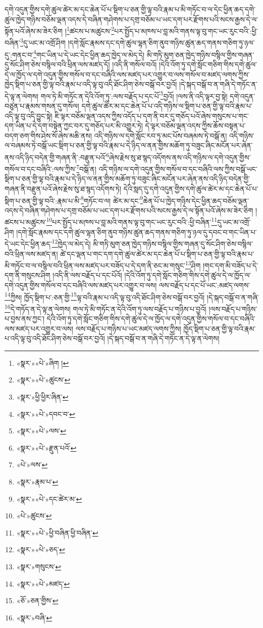 དགེ་འདུན་གྱིས་དགེ་ཚུལ་ཚེར་མ་དང་ཆེན་པོ་པ་སྡིག་པ་ཅན་གྱི་ལྟ་བའི་རྣམ་པ་མི་གཏོང་བ་ལ་དེང་ཕྱིན་ཆད་དགེ་ཚུལ་ཁྱེད་གཉིས་བཅོམ་ལྡན་འདས་དེ་བཞིན་གཤེགས་པ་དགྲ་བཅོམ་པ་ཡང་དག་པར་རྫོགས་པའི་སངས་རྒྱས་དེ་ལ་སྟོན་པའོ་ཞེས་མ་ཟེར་ཅིག །\footnote{«སྣར་»«པེ་»ཞིག །}ཚངས་པ་མཚུངས་\footnote{«སྣར་»«པེ་»ཚུངས་}པར་སྤྱོད་པ་མཁས་པ་བླ་མའི་གནས་ལྟ་བུ་གང་ཡང་རུང་བའི་:ཕྱི་བཞིན་\footnote{«སྣར་»ཕྱི་ཕྱིར་ཞིན་}དུ་ཡང་མ་འགྲོ་ཤིག །དགེ་སློང་རྣམས་དང་དགེ་ཚུལ་ལྷན་ཅིག་ནུབ་གཉིས་ཚུན་ཆད་གནས་གཅིག་ཏུ་ཉལ་དུ་:གནང་བ་\footnote{«སྣར་»«པེ་»དབང་བ་}གང་ཡིན་པ་དེ་ཡང་དེང་ཕྱིན་ཆད་ཁྱེད་ལ་མེད་དེ། མི་གཏི་མུག་ཅན་ཁྱེད་གཉིས་བསྙིལ་གྱིས་གཞན་དུ་སོང་ཤིག་ཅེས་བསྙིལ་བའི་ཕྲིན་ལས་མཛད་དོ། །འདི་ནི་གསོལ་བའོ། །དེའི་འོག་ཏུ་དགེ་སློང་གཅིག་གིས་དགེ་ཚུལ་དེ་ལ་ཁྱོད་ལ་དགེ་འདུན་གྱིས་གསོལ་བ་དང་བཞིའི་ལས་མཛད་པར་འགྱུར་བ་ལས་གསོལ་བ་མཛད་ལགས་ཀྱིས་ཁྱེད་སྡིག་པ་ཅན་གྱི་ལྟ་བའི་རྣམ་པ་འདི་ལྟ་བུ་འདི་ཐོང་ཤིག་ཅེས་བསྒོ་བར་བྱའོ། །དེ་སྐད་བསྒོ་བ་ན་གཞི་དེ་གཏོང་ན་དེ་ལྟ་ན་ལེགས། གལ་ཏེ་མི་གཏོང་ན་དེའི་འོག་ཏུ་:ལས་བརྗོད་པ་དང་པོ་\footnote{«སྣར་»«པེ་»ལས་}བྱའོ། །ལས་ནི་འདི་ལྟར་བྱ་སྟེ། དགེ་འདུན་བཙུན་པ་རྣམས་གསན་དུ་གསོལ། དགེ་ཚུལ་ཚེར་མ་དང་ཆེན་པོ་པ་འདི་གཉིས་ལ་སྡིག་པ་ཅན་གྱི་ལྟ་བའི་རྣམ་པ་འདི་ལྟ་བུ་འདི་བྱུང་སྟེ། ཇི་ལྟར་བཅོམ་ལྡན་འདས་ཀྱིས་འདོད་པ་དག་ནི་བར་དུ་གཅོད་པའོ་ཞེས་གསུངས་པ་གང་དག་ཡིན་པ་དེ་དག་བསྟེན་ཀྱང་བར་དུ་གཅོད་པར་མི་འགྱུར་ཏེ། དེ་ལྟར་བཅོམ་ལྡན་འདས་ཀྱིས་ཆོས་བསྟན་པ་བདག་ཅག་གིས་ཤེས་སོ་ཞེས་མཆི་ནས། འདི་གཉིས་ལ་དགེ་སློང་རབ་ཏུ་མང་པོས་བཞམས་ཏེ་བསྒོ་ན། འདི་གཉིས་ལ་བཞམས་ཏེ་བསྒོ་ཡང་སྡིག་པ་ཅན་གྱི་ལྟ་བའི་རྣམ་པ་དེ་ཉིད་ལ་ནན་གྱིས་མཆོག་ཏུ་བཟུང་ཞིང་མངོན་པར་ཞེན་ནས་འདི་ཉིད་བདེན་གྱི་གཞན་ནི་:བརྫུན་པའོ་\footnote{«སྣར་»«པེ་»རྫུན་པའོ་}ཞེས་རྗེས་སུ་ཐ་སྙད་འདོགས་ནས་འདི་གཉིས་ལ་དགེ་འདུན་གྱིས་གསོལ་བ་དང་བཞིའི་:ལས་ཀྱིས་\footnote{«པེ་»ལས་}བསྒོ་ན། འདི་གཉིས་ལ་དགེ་འདུན་གྱིས་གསོལ་བ་དང་བཞིའི་ལས་ཀྱིས་བསྒོ་ཡང་སྡིག་པ་ཅན་གྱི་ལྟ་བའི་རྣམ་པ་དེ་ཉིད་ལ་ནན་གྱིས་མཆོག་ཏུ་བཟུང་ཞིང་མངོན་པར་ཞེན་ནས་འདི་ཉིད་བདེན་གྱི་གཞན་ནི་བརྫུན་པའོ་ཞེས་རྗེས་སུ་ཐ་སྙད་འདོགས་ཏེ། དེའི་སླད་དུ་དགེ་འདུན་གྱིས་དགེ་ཚུལ་ཚེར་མ་དང་ཆེན་པོ་པ་སྡིག་པ་ཅན་གྱི་ལྟ་བའི་:རྣམ་པ་མི་\footnote{«སྣར་»རྣམ་པ་}གཏོང་བ་ལ། ཚེར་མ་དང་\footnote{«སྣར་»«པེ་»དང་ཚེར་མ་}ཆེན་པོ་པ་ཁྱེད་གཉིས་དེང་ཕྱིན་ཆད་བཅོམ་ལྡན་འདས་དེ་བཞིན་གཤེགས་པ་དགྲ་བཅོམ་པ་ཡང་དག་པར་རྫོགས་པའི་སངས་རྒྱས་དེ་ལ་སྟོན་པའོ་ཞེས་མ་ཟེར་ཅིག །ཚངས་པ་མཚུངས་\footnote{«པེ་»ཚུངས་}པར་སྤྱོད་པ་མཁས་པ་བླ་མའི་གནས་ལྟ་བུ་གང་ཡང་རུང་བའི་:ཕྱི་བཞིན་\footnote{«སྣར་»«པེ་»ཕྱི་བཞིན་ཕྱི་བཞིན་}དུ་ཡང་མ་འགྲོ་ཤིག །དགེ་སློང་རྣམས་དང་དགེ་ཚུལ་ལྷན་ཅིག་ནུབ་གཉིས་ཚུན་ཆད་གནས་གཅིག་ཏུ་ཉལ་དུ་དབང་བ་གང་ཡིན་པ་དེ་ཡང་དེང་ཕྱིན་ཆད་\footnote{«སྣར་»«པེ་»ཅད་}ཁྱེད་ལ་མེད་དེ། མི་གཏི་མུག་ཅན་ཁྱེད་གཉིས་བསྙིལ་གྱིས་གཞན་དུ་སོང་ཤིག་ཅེས་བསྙིལ་བའི་ཕྲིན་ལས་མཛད་ན། ཚེ་དང་ལྡན་པ་གང་དག་དགེ་ཚུལ་ཚེར་མ་དང་ཆེན་པོ་པ་སྡིག་པ་ཅན་གྱི་ལྟ་བའི་རྣམ་པ་མི་གཏོང་བ་ལ་བསྙིལ་བའི་ཕྲིན་ལས་མཛད་པར་བཟོད་པ་དེ་དག་ནི་ཅང་མ་གསུང་\footnote{«སྣར་»གསུངས་}ཤིག །གང་དག་མི་བཟོད་པ་དེ་དག་ནི་གསུངས་ཤིག །འདི་ནི་ལས་བརྗོད་པ་དང་པོའོ། །དེའི་འོག་ཏུ་དགེ་སློང་གཅིག་གིས་དགེ་ཚུལ་དེ་ལ་ཁྱོད་ལ་དགེ་འདུན་གྱིས་གསོལ་བ་དང་བཞིའི་ལས་མཛད་པར་འགྱུར་བ་ལས། ལས་བརྗོད་པ་དང་པོ་ཡང་:མཛད་ལགས་\footnote{«སྣར་»«པེ་»མཛད་}ཀྱིས། ཁྱོད་སྡིག་པ་:ཅན་གྱི་\footnote{«ཅོ་»ཅན་གྱིས་}ལྟ་བའི་རྣམ་པ་འདི་ལྟ་བུ་འདི་ཐོང་ཤིག་ཅེས་བསྒོ་བར་བྱའོ། །དེ་སྐད་བསྒོ་བ་ན་གཞི་\footnote{«སྣར་»བཞི་}དེ་གཏོད་ན་དེ་ལྟ་ན་ལེགས། གལ་ཏེ་མི་གཏོང་ན་དེའི་འོག་ཏུ་ལས་བརྗོད་པ་གཉིས་པ་བྱའོ། །ལས་བརྗོད་པ་གཉིས་པ་བྱས་ནས་ཀྱང་། དེའི་འོག་ཏུ་དགེ་སློང་གཅིག་གིས་དགེ་ཚུལ་དེ་ལ་ཁྱོད་ལ་དགེ་འདུན་གྱིས་གསོལ་བ་དང་བཞིའི་ལས་མཛད་པར་འགྱུར་བ་ལས། ལས་བརྗོད་པ་གཉིས་པ་ཡང་མཛད་ལགས་ཀྱིས། ཁྱོད་སྡིག་པ་ཅན་གྱི་ལྟ་བའི་རྣམ་པ་འདི་ལྟ་བུ་འདི་ཐོང་ཤིག་ཅེས་བསྒོ་བར་བྱའོ། །དེ་སྐད་བསྒོ་བ་ན་གཞི་དེ་གཏོང་ན་དེ་ལྟ་ན་ལེགས། 